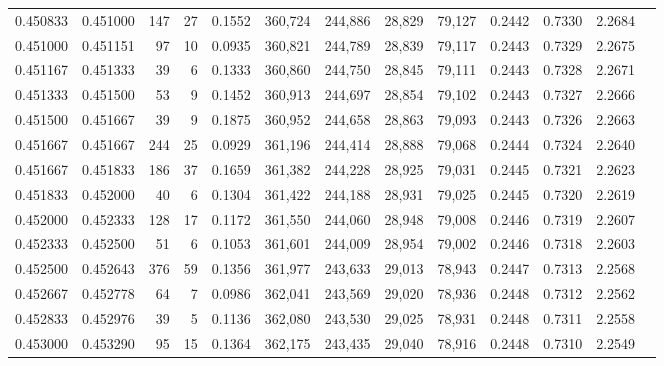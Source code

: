 \begin{tabular}{rrrrrrrrrrrrr}
0.450833 & 0.451000 &   147 &  27 &                                     0.1552 & 360,724 & 244,886 &  28,829 &  79,127 & 0.2442 & 0.7330 & 2.2684 \\
0.451000 & 0.451151 &    97 &  10 &                                     0.0935 & 360,821 & 244,789 &  28,839 &  79,117 & 0.2443 & 0.7329 & 2.2675 \\
0.451167 & 0.451333 &    39 &   6 &                                     0.1333 & 360,860 & 244,750 &  28,845 &  79,111 & 0.2443 & 0.7328 & 2.2671 \\
0.451333 & 0.451500 &    53 &   9 &                                     0.1452 & 360,913 & 244,697 &  28,854 &  79,102 & 0.2443 & 0.7327 & 2.2666 \\
0.451500 & 0.451667 &    39 &   9 &                                     0.1875 & 360,952 & 244,658 &  28,863 &  79,093 & 0.2443 & 0.7326 & 2.2663 \\
0.451667 & 0.451667 &   244 &  25 &                                     0.0929 & 361,196 & 244,414 &  28,888 &  79,068 & 0.2444 & 0.7324 & 2.2640 \\
0.451667 & 0.451833 &   186 &  37 &                                     0.1659 & 361,382 & 244,228 &  28,925 &  79,031 & 0.2445 & 0.7321 & 2.2623 \\
0.451833 & 0.452000 &    40 &   6 &                                     0.1304 & 361,422 & 244,188 &  28,931 &  79,025 & 0.2445 & 0.7320 & 2.2619 \\
0.452000 & 0.452333 &   128 &  17 &                                     0.1172 & 361,550 & 244,060 &  28,948 &  79,008 & 0.2446 & 0.7319 & 2.2607 \\
0.452333 & 0.452500 &    51 &   6 &                                     0.1053 & 361,601 & 244,009 &  28,954 &  79,002 & 0.2446 & 0.7318 & 2.2603 \\
0.452500 & 0.452643 &   376 &  59 &                                     0.1356 & 361,977 & 243,633 &  29,013 &  78,943 & 0.2447 & 0.7313 & 2.2568 \\
0.452667 & 0.452778 &    64 &   7 &                                     0.0986 & 362,041 & 243,569 &  29,020 &  78,936 & 0.2448 & 0.7312 & 2.2562 \\
0.452833 & 0.452976 &    39 &   5 &                                     0.1136 & 362,080 & 243,530 &  29,025 &  78,931 & 0.2448 & 0.7311 & 2.2558 \\
0.453000 & 0.453290 &    95 &  15 &                                     0.1364 & 362,175 & 243,435 &  29,040 &  78,916 & 0.2448 & 0.7310 & 2.2549 \\

\end{tabular}
